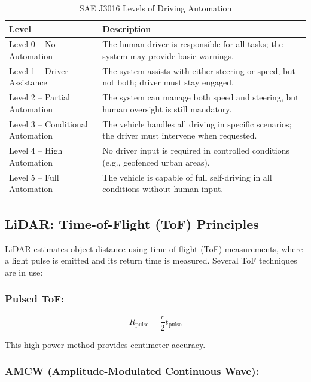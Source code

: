 \documentclass[12pt]{article}
\begin{document}
\begin{table}[H]
  \centering
  \caption{SAE J3016 Levels of Driving Automation}
  \label{tab:sae}
  \begin{tabular}{|p{5.5cm}|p{9.5cm}|}
    \hline
    \textbf{Level} & \textbf{Description} \\
    \hline
    Level 0 – No Automation & The human driver is responsible for all tasks; the system may provide basic warnings. \\
    \hline
    Level 1 – Driver Assistance & The system assists with either steering or speed, but not both; driver must stay engaged. \\
    \hline
    Level 2 – Partial Automation & The system can manage both speed and steering, but human oversight is still mandatory. \\
    \hline
    Level 3 – Conditional Automation & The vehicle handles all driving in specific scenarios; the driver must intervene when requested. \\
    \hline
    Level 4 – High Automation & No driver input is required in controlled conditions (e.g., geofenced urban areas). \\
    \hline
    Level 5 – Full Automation & The vehicle is capable of full self-driving in all conditions without human input. \\
    \hline
  \end{tabular}
\end{table}

\subsection{LiDAR: Time-of-Flight (ToF) Principles}

LiDAR estimates object distance using time-of-flight (ToF) measurements, where a light pulse is emitted and its return time is measured. Several ToF techniques are in use:

\subsubsection{Pulsed ToF:}

\begin{equation}
R_{\text{pulse}} = \frac{c}{2} t_{\text{pulse}}
\label{eq:tof_pulse}
\end{equation}

This high-power method provides centimeter accuracy.

\subsubsection{AMCW (Amplitude-Modulated Continuous Wave):}
\end{document}
